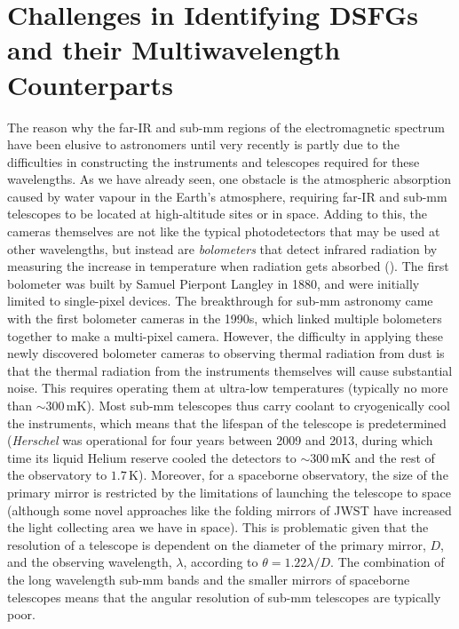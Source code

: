 \section{Challenges in Identifying DSFGs and their Multiwavelength Counterparts}
\label{sec:challenges}

The reason why the far-IR and sub-mm regions of the electromagnetic spectrum have been elusive to astronomers until very recently is partly due to the difficulties in constructing the instruments and telescopes required for these wavelengths. As we have already seen, one obstacle is the atmospheric absorption caused by water vapour in the Earth's atmosphere, requiring far-IR and sub-mm telescopes to be located at high-altitude sites or in space. Adding to this, the cameras themselves are not like the typical photodetectors that may be used at other wavelengths, but instead are \textit{bolometers} that detect infrared radiation by measuring the increase in temperature when radiation gets absorbed (\citealt{Woodcraft_2009}). The first bolometer was built by Samuel Pierpont Langley in 1880, and were initially limited to single-pixel devices. The breakthrough for sub-mm astronomy came with the first bolometer cameras in the 1990s, which linked multiple bolometers together to make a multi-pixel camera. However, the difficulty in applying these newly discovered bolometer cameras to observing thermal radiation from dust is that the thermal radiation from the instruments themselves will cause substantial noise. This requires operating them at ultra-low temperatures (typically no more than $\sim 300\,$mK). Most sub-mm telescopes thus carry coolant to cryogenically cool the instruments, which means that the lifespan of the telescope is predetermined (\textit{Herschel} was operational for four years between 2009 and 2013, during which time its liquid Helium reserve cooled the detectors to $\sim 300\,$mK and the rest of the observatory to $1.7\,$K). Moreover, for a spaceborne observatory, the size of the primary mirror is restricted by the limitations of launching the telescope to space (although some novel approaches like the folding mirrors of JWST have increased the light collecting area we have in space). This is problematic given that the resolution of a telescope is dependent on the diameter of the primary mirror, $D$, and the observing wavelength, $\lambda$, according to $\theta = 1.22\lambda/D$. The combination of the long wavelength sub-mm bands and the smaller mirrors of spaceborne telescopes means that the angular resolution of sub-mm telescopes are typically poor.

